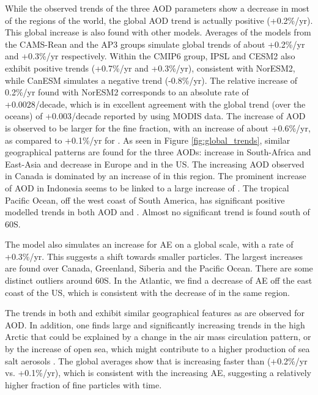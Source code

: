 \documentclass[acp, manuscript]{copernicus}
\begin{document}
While the observed trends of the three AOD parameters show a decrease in most of the regions of the world, the global AOD trend is actually positive (+0.2\%/yr). This global increase is also found with other models. Averages of the models from the CAMS-Rean and the AP3 groups simulate global trends of about +0.2\%/yr and +0.3\%/yr respectively. Within the CMIP6 group, IPSL and CESM2 also exhibit positive trends (+0.7\%/yr and +0.3\%/yr), consistent with NorESM2, while CanESM simulates a negative trend (-0.8\%/yr). The relative increase of 0.2\%/yr found with NorESM2 corresponds to an absolute rate of +0.0028/decade, which is in excellent agreement with the global trend (over the oceans) of +0.003/decade reported by \cite{zhang2010decadal} using MODIS data. The increase of AOD is observed to be larger for the fine fraction, with an increase of about +0.6\%/yr, as compared to +0.1\%/yr for . As seen in Figure \ref{fig:global_trends}, similar geographical patterns are found for the three AODs: increase in South-Africa and East-Asia and decrease in Europe and in the US. The increasing AOD observed in Canada is dominated by an increase of  in this region. The prominent increase of AOD in Indonesia seems to be linked to a large increase of . The tropical Pacific Ocean, off the west coast of South America, has significant positive modelled trends in both AOD and . Almost no significant trend is found south of 60\textdegree S.

The model also simulates an increase for AE on a global scale, with a rate of +0.3\%/yr. This suggests a shift towards smaller particles. The largest increases are found over Canada, Greenland, Siberia and the Pacific Ocean. There are some distinct outliers around 60\textdegree S. In the Atlantic, we find a decrease of AE off the east coast of the US, which is consistent with the decrease of  in the same region.

The trends in both  and  exhibit similar geographical features as are observed for AOD. In addition, one finds large and significantly increasing trends in the high Arctic that could be explained by a change in the air mass circulation pattern, or by the increase of open sea, which might contribute to a higher production of sea salt aerosols \citep{Willis2018,abbatt-2019}. The global averages show that  is increasing faster than   (+0.2\%/yr vs. +0.1\%/yr), which is consistent with the increasing AE, suggesting a relatively higher fraction of fine particles with time.
\end{document}
